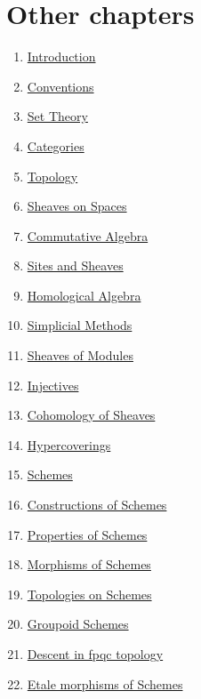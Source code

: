 \section{Other chapters}

\begin{multicols}{2}
\begin{enumerate}
\item \hyperref[introduction-section-overview]{Introduction}
\item \hyperref[conventions-section-comments]{Conventions}
\item \hyperref[sets-section-introduction]{Set Theory}
\item \hyperref[categories-section-introduction]{Categories}
\item \hyperref[topology-section-introduction]{Topology}
\item \hyperref[sheaves-section-introduction]{Sheaves on Spaces}
\item \hyperref[algebra-section-introduction]{Commutative Algebra}
\item \hyperref[sites-section-introduction]{Sites and Sheaves}
\item \hyperref[homology-section-introduction]{Homological Algebra}
\item \hyperref[simplicial-section-introduction]{Simplicial Methods}
\item \hyperref[modules-section-introduction]{Sheaves of Modules}
\item \hyperref[injectives-section-introduction]{Injectives}
\item \hyperref[cohomology-section-introduction]{Cohomology of Sheaves}
\item \hyperref[hypercovering-section-introduction]{Hypercoverings}
\item \hyperref[schemes-section-introduction]{Schemes}
\item \hyperref[constructions-section-introduction]{Constructions of Schemes}
\item \hyperref[properties-section-introduction]{Properties of Schemes}
\item \hyperref[morphisms-section-introduction]{Morphisms of Schemes}
\item \hyperref[topologies-section-introduction]{Topologies on Schemes}
\item \hyperref[groupoids-section-introduction]{Groupoid Schemes}
\item \hyperref[fpqc-descent-section-introduction]{Descent in fpqc topology}
\item \hyperref[etale-section-introduction]{Etale morphisms of Schemes}

\end{enumerate}
\end{multicols}
